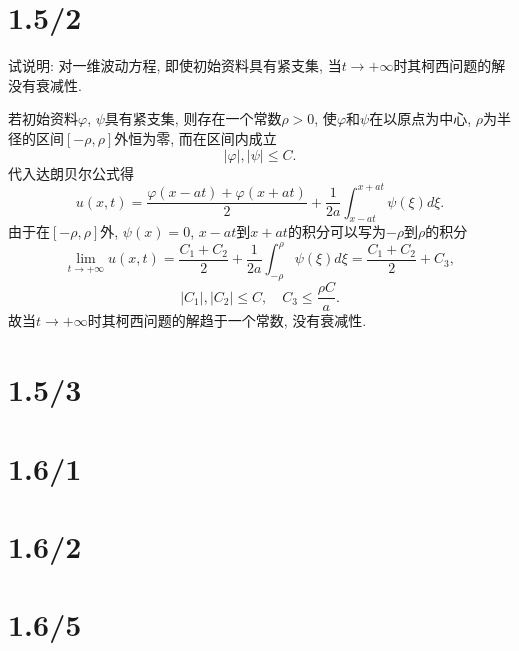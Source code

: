 \documentclass[11pt,a4paper]{article}
\author{刘逸灏 (515370910207)}
\begin{document}
\maketitle

\section{1.5/2}
\begin{problem}
试说明: 对一维波动方程, 即使初始资料具有紧支集, 当$t\to+\infty$时其柯西问题的解没有衰减性.
\end{problem}

若初始资料$\varphi$, $\psi$具有紧支集, 则存在一个常数$\rho>0$, 使$\varphi$和$\psi$在以原点为中心, $\rho$为半径的区间$[-\rho,\rho]$外恒为零, 而在区间内成立
$$|\varphi|,|\psi|\leqslant C.$$
代入达朗贝尔公式得
$$u(x,t)=\frac{\varphi(x-at)+\varphi(x+at)}{2}+\frac{1}{2a}\int_{x-at}^{x+at}\psi(\xi)d\xi.$$
由于在$[-\rho,\rho]$外, $\psi(x)=0$, $x-at$到$x+at$的积分可以写为$-\rho$到$\rho$的积分
$$\lim_{t\to+\infty}u(x,t)=\frac{C_1+C_2}{2}+\frac{1}{2a}\int_{-\rho}^{\rho}\psi(\xi)d\xi=\frac{C_1+C_2}{2}+C_3,$$
$$|C_1|,|C_2|\leqslant C,\quad C_3\leqslant\frac{\rho C}{a}.$$
故当$t\to+\infty$时其柯西问题的解趋于一个常数, 没有衰减性.

\section{1.5/3}

\section{1.6/1}
\section{1.6/2}
\section{1.6/5}
\end{document}
